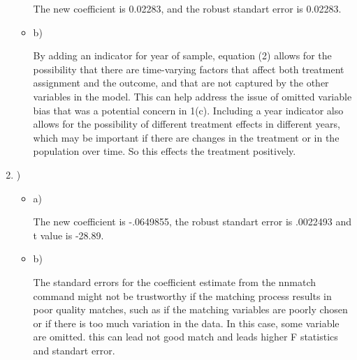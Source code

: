 \documentclass{article}
\begin{document}
\begin{enumerate}
\begin{itemize}
The new coefficient is 0.02283, and the robust standart error is 0.02283. 

\vspace{0.5cm}

\item b)

\vspace{0.5cm}

By adding an indicator for year of sample, equation (2) allows for the possibility that there are time-varying factors that affect both treatment assignment and the outcome, and that are not captured by the other variables in the model. This can help address the issue of omitted variable bias that was a potential concern in 1(c). Including a year indicator also allows for the possibility of different treatment effects in different years, which may be important if there are changes in the treatment or in the population over time. So this effects the treatment positively. 

\end {itemize}

\vspace{2.0cm}

\vspace{2.0cm}

\item )

\begin{itemize}

\item a)

\vspace{0.5cm}

 The new coefficient is -.0649855, the robust standart error is .0022493 and t value is -28.89.
 
\vspace{0.5cm}

\item b)

\vspace{0.5cm}

The standard errors for the coefficient estimate from the nnmatch command might not be trustworthy if the matching process results in poor quality matches, such as if the matching variables are poorly chosen or if there is too much variation in the data. In this case, some variable are omitted. this can lead not good match and leads higher F statistics and standart error.

\end {itemize}
\end {enumerate}
\end{document}
